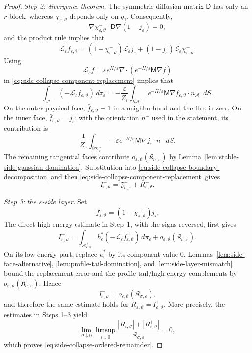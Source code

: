 \documentclass[10pt,a4paper]{amsart}
\newcommand{\calL}{\mathcal L}
\newcommand{\eps}{\varepsilon}
\begin{document}
\begin{proof}
\emph{Step 2: divergence theorem.}
The symmetric diffusion matrix $\mathsf D$ has only an $r$-block, whereas
$\chi_{\eps,\vartheta}^-$ depends only on $q_1$.  Consequently,
\[
\nabla\chi_{\eps,\vartheta}^-\cdot\mathsf D\nabla(1-j_\eps)=0,
\]
and the product rule implies that
\begin{equation}
\label{eq:side-collapse-generator-product}
\calL_\eps\bar f_{\eps,\vartheta}
=(1-\chi_{\eps,\vartheta}^-)\calL_\eps j_\eps
+(1-j_\eps)\calL_\eps\chi_{\eps,\vartheta}^-.
\end{equation}
Using
\[
\calL_\eps f
=\eps e^{H/\eps}
\nabla\cdot\left(e^{-H/\eps}\mathsf M\nabla f\right)
\]
in \eqref{eq:side-collapse-component-replacement} implies that
\begin{equation}
\label{eq:side-collapse-boundary-decomposition}
\int_{\mathcal A^-}(-\calL_\eps\bar f_{\eps,\vartheta})\,d\pi_\eps
=-\frac{\eps}{Z_\eps}
\int_{\partial\mathcal A^-}
e^{-H/\eps}\mathsf M\nabla\bar f_{\eps,\vartheta}
\cdot n_{\mathcal A^-}\,dS.
\end{equation}
On the outer physical face, $\bar f_{\eps,\vartheta}=1$ in a neighborhood and
the flux is zero.  On the inner face,
$\bar f_{\eps,\vartheta}=j_\eps$; with the orientation $n^-$ used in the
statement, its contribution is
\[
\frac1{Z_\eps}
\int_{\partial\mathcal K_\eps^-}
-\eps e^{-H/\eps}\mathsf M\nabla j_\eps\cdot n^-\,dS.
\]
The remaining tangential faces contribute
$o_{\eps,\vartheta}(\mathfrak K_{\sigma,\eps})$ by
Lemma~\ref{lem:stable-side-gaussian-domination}.  Substitution into
\eqref{eq:side-collapse-boundary-decomposition} and then
\eqref{eq:side-collapse-component-replacement} gives
\[
I_{\eps,\vartheta}^-
=\mathfrak J_{\sigma,\eps}^-+R_{\eps,\vartheta}^-.
\]

\emph{Step 3: the $s$-side layer.}
Set
\[
\bar f_{\eps,\vartheta}^+=(1-\chi_{\eps,\vartheta}^+)j_\eps.
\]
The direct high-energy estimate in Step~1, with the signs reversed, first
gives
\[
I_{\eps,\vartheta}^+
=\int_{\mathcal A_{\eps,\vartheta}^+}h_\eps^*
(-\calL_\eps\bar f_{\eps,\vartheta}^+)\,d\pi_\eps
+o_{\eps,\vartheta}(\mathfrak K_{\sigma,\eps}).
\]
On its low-energy part, replace $h_\eps^*$ by its component value $0$.
Lemmas~\ref{lem:side-face-alternative},
\ref{lem:profile-tail-domination}, and
\ref{lem:side-layer-mismatch} bound the replacement error and the
profile-tail/high-energy complements by
$o_{\eps,\vartheta}(\mathfrak K_{\sigma,\eps})$.  Hence
\[
I_{\eps,\vartheta}^+
=o_{\eps,\vartheta}(\mathfrak K_{\sigma,\eps}),
\]
and therefore the same estimate holds for
$R_{\eps,\vartheta}^+=I_{\eps,\vartheta}^+$.
More precisely, the estimates in Steps 1--3 yield
\[
\lim_{\vartheta\downarrow0}\limsup_{\eps\downarrow0}
\frac{|R_{\eps,\vartheta}^-|+|R_{\eps,\vartheta}^+|}
{\mathfrak K_{\sigma,\eps}}=0,
\]
which proves \eqref{eq:side-collapse-ordered-remainder}.
\end{proof}
\end{document}
